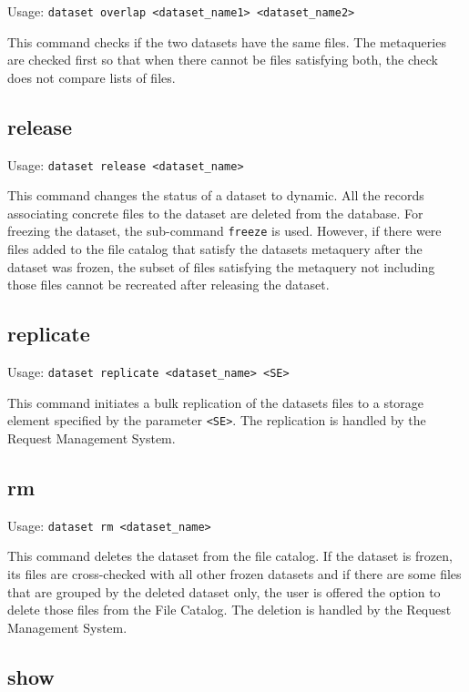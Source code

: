 Usage: \texttt{dataset overlap <dataset\_name1> <dataset\_name2> }

This command checks if the two datasets have the same files. The metaqueries are
checked first so that when there cannot be files satisfying both,
the check does not compare lists of files.

\pagebreak

\subsection{release}

Usage: \texttt{dataset release <dataset\_name>}

This command changes the status of a dataset to dynamic. All the records
associating concrete files to the dataset are deleted from the
database. For freezing the dataset, the sub-command \texttt{freeze}
is used. However, if there were files added to the file catalog that
satisfy the datasets metaquery after the dataset was frozen, the
subset of files satisfying the metaquery not including those files
cannot be recreated after releasing the dataset.

\subsection{replicate}

Usage: \texttt{dataset replicate <dataset\_name> <SE>}

This command initiates a bulk replication of the datasets files to a storage
element specified by the parameter \texttt{<SE>}. The replication
is handled by the Request Management System.

\subsection{rm}

Usage: \texttt{dataset rm <dataset\_name>}

This command deletes the dataset from the file catalog. If the dataset is
frozen, its files are cross-checked with all other frozen datasets
and if there are some files that are grouped by the deleted dataset
only, the user is offered the option to delete those files from the
File Catalog. The deletion is handled by the Request Management
System.

\subsection{show}

